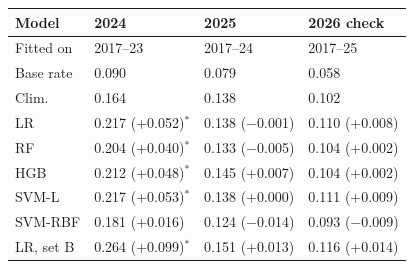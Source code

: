 \begin{tabular}{llll}
\toprule
Model & 2024 & 2025 & 2026 check \\
\midrule
Fitted on & 2017--23 & 2017--24 & 2017--25 \\
Base rate & 0.090 & 0.079 & 0.058 \\
Clim. & 0.164 & 0.138 & 0.102 \\
\midrule
LR & 0.217 (+0.052)$^{*}$ & 0.138 ($-$0.001) & 0.110 (+0.008) \\
RF & 0.204 (+0.040)$^{*}$ & 0.133 ($-$0.005) & 0.104 (+0.002) \\
HGB & 0.212 (+0.048)$^{*}$ & 0.145 (+0.007) & 0.104 (+0.002) \\
SVM-L & 0.217 (+0.053)$^{*}$ & 0.138 (+0.000) & 0.111 (+0.009) \\
SVM-RBF & 0.181 (+0.016) & 0.124 ($-$0.014) & 0.093 ($-$0.009) \\
\midrule
LR, set B & 0.264 (+0.099)$^{*}$ & 0.151 (+0.013) & 0.116 (+0.014) \\
\bottomrule
\end{tabular}
